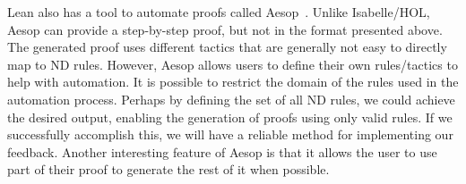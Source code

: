 Lean also has a tool to automate proofs called Aesop~\cite{leanprovercommunity_2021_github}. Unlike Isabelle/HOL, Aesop can provide a step-by-step proof, but not in the format presented above. The generated proof uses different tactics that are generally not easy to directly map to \gls{ND} rules. However, Aesop allows users to define their own rules/tactics to help with automation. It is possible to restrict the domain of the rules used in the automation process. Perhaps by defining the set of all \gls{ND} rules, we could achieve the desired output, enabling the generation of proofs using only valid rules. If we successfully accomplish this, we will have a reliable method for implementing our feedback. Another interesting feature of Aesop is that it allows the user to use part of their proof to generate the rest of it when possible.




